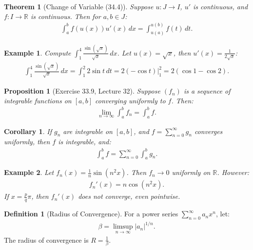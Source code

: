 \documentclass[7pt]{article}
\theoremstyle{definition}
\newtheorem{definition}{Definition}
\theoremstyle{plain}
\newtheorem{theorem}{Theorem}
\newtheorem{proposition}{Proposition}
\newtheorem{example}{Example}
\newtheorem{corollary}{Corollary}
\begin{document}
\begin{theorem}[Change of Variable (34.4)]
Suppose $ u : J \to I $, $ u' $ is continuous, and $ f : I \to \mathbb{R} $ is continuous. Then for $ a, b \in J $:
\begin{align}
\int_a^b f(u(x)) u'(x) \, dx = \int_{u(a)}^{u(b)} f(t) \, dt.
\end{align}
\end{theorem}

\begin{example}
Compute $ \int_1^4 \frac{\sin(\sqrt{x})}{\sqrt{x}} \, dx $. Let $ u(x) = \sqrt{x} $, then $ u'(x) = \frac{1}{2\sqrt{x}} $:
\begin{align}
\int_1^4 \frac{\sin(\sqrt{x})}{\sqrt{x}} \, dx = \int_1^2 2 \sin t \, dt = 2(-\cos t) \big|_1^2 = 2(\cos 1 - \cos 2).
\end{align}
\end{example}

\begin{proposition}[Exercise 33.9, Lecture 32]
Suppose $ (f_n) $ is a sequence of integrable functions on $ [a, b] $ converging uniformly to $ f $. Then:
\begin{align}
\lim_{n \to \infty} \int_a^b f_n = \int_a^b f.
\end{align}
\end{proposition}

\begin{corollary}
If $ g_n $ are integrable on $ [a, b] $, and $ f = \sum_{n=0}^\infty g_n $ converges uniformly, then $ f $ is integrable, and:
\begin{align}
\int_a^b f = \sum_{n=0}^\infty \int_a^b g_n.
\end{align}
\end{corollary}

\begin{example}
Let $ f_n(x) = \frac{1}{n} \sin(n^2 x) $. Then $ f_n \to 0 $ uniformly on $ \mathbb{R} $. However:
\begin{align}
f_n'(x) = n \cos(n^2 x).
\end{align}
If $ x = \frac{p}{q} \pi $, then $ f_n'(x) $ does not converge, even pointwise.
\end{example}

\begin{definition}[Radius of Convergence]
For a power series $ \sum_{n=0}^\infty a_n x^n $, let:
\begin{align}
\beta = \limsup_{n \to \infty} |a_n|^{1/n}.
\end{align}
The radius of convergence is $ R = \frac{1}{\beta} $.
\end{definition}
\end{document}
